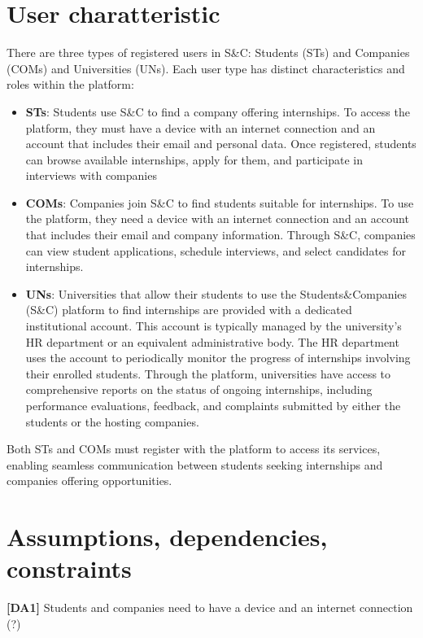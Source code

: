 \section{User charatteristic}

There are three types of registered users in S\&C: Students (STs) and Companies (COMs) and Universities (UNs). Each user type has distinct characteristics and roles within the platform:

\begin{itemize}
    \item \textbf{STs}: Students use S\&C to find a company offering internships. To access the platform, they must have a device with an internet connection and an account that includes their email and personal data. Once registered, students can browse available internships, apply for them, and participate in interviews with 
    companies

    \item \textbf{COMs}:  Companies join S\&C to find students suitable for internships. To use the platform, they need a device with an internet connection and an account that includes their email and company information. Through S\&C, companies can view student applications, schedule interviews, and select candidates for internships.

    \item \textbf{UNs}: Universities that allow their students to use the Students\&Companies (S\&C) platform to find internships are provided with a dedicated institutional account. This account is typically managed by the university’s HR department or an equivalent administrative body.
    The HR department uses the account to periodically monitor the progress of internships involving their enrolled students. Through the platform, universities have access to comprehensive reports on the status of ongoing internships, including performance evaluations, feedback, and complaints submitted by either the students or the hosting companies.
    
\end{itemize}

Both STs and COMs must register with the platform to access its services, enabling seamless communication between students seeking internships and companies offering opportunities.

\section{Assumptions, dependencies, constraints}
\textbf{[DA1] }Students and companies need to have a device and an internet connection (?)

